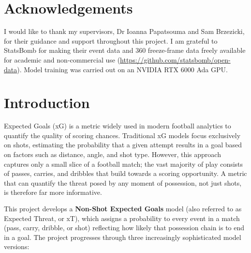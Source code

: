 \documentclass{article}
\begin{document}
\newpage
\tableofcontents
\newpage

\section*{Acknowledgements}
I would like to thank my supervisors, Dr Ioanna Papatsouma and Sam Brzezicki, for their guidance and support throughout this project. I am grateful to StatsBomb for making their event data and 360 freeze-frame data freely available for academic and non-commercial use (\url{https://github.com/statsbomb/open-data}). Model training was carried out on an NVIDIA RTX 6000 Ada GPU.

\newpage

\section{Introduction}

Expected Goals (xG) is a metric widely used in modern football analytics to quantify the quality of scoring chances. Traditional xG models focus exclusively on shots, estimating the probability that a given attempt results in a goal based on factors such as distance, angle, and shot type. However, this approach captures only a small slice of a football match; the vast majority of play consists of passes, carries, and dribbles that build towards a scoring opportunity. A metric that can quantify the threat posed by any moment of possession, not just shots, is therefore far more informative.

This project develops a \textbf{Non-Shot Expected Goals} model (also referred to as Expected Threat, or xT), which assigns a probability to every event in a match (pass, carry, dribble, or shot) reflecting how likely that possession chain is to end in a goal. The project progresses through three increasingly sophisticated model versions:
\end{document}
